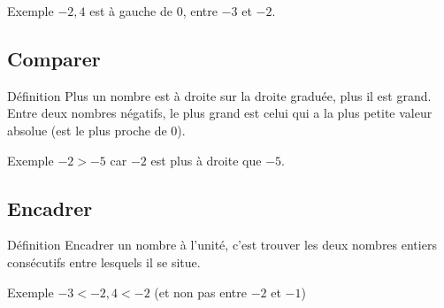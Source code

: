 \begin{astuce}{Exemple}
$-2{,}4$ est à gauche de $0$, entre $-3$ et $-2$.
\end{astuce}

\vspace{10pt}
\subsection{Comparer}

\begin{regle}{Définition}
Plus un nombre est à droite sur la droite graduée, plus il est grand. Entre deux nombres négatifs, le plus grand est celui qui a la plus petite valeur absolue (est le plus proche de $0$).
\end{regle}

\vspace{6pt}
\begin{astuce}{Exemple}
$-2 > -5$ car $-2$ est plus à droite que $-5$.
\end{astuce}

\vspace{10pt}
\subsection{Encadrer}

\begin{regle}{Définition}
Encadrer un nombre à l'unité, c'est trouver les deux nombres entiers consécutifs entre lesquels il se situe.
\end{regle}

\vspace{6pt}
\begin{astuce}{Exemple}
$-3 < -2{,}4 < -2$ \quad (et non pas entre $-2$ et $-1$)
\end{astuce}